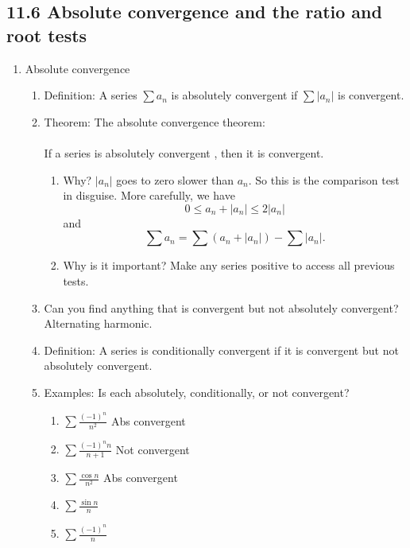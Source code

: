 \documentclass{article}
\newcommand{\ds}{\displaystyle}
\begin{document}
\subsection{11.6 Absolute convergence and the ratio and root tests}
\begin{enumerate}

\item Absolute convergence 
\begin{enumerate}

\item Definition: A series $\sum a_n$ is absolutely convergent if $\sum |a_n|$ is convergent.

\item Theorem: The absolute convergence theorem:\\ \ \\
If a series is absolutely convergent , then it is convergent. \\
\begin{enumerate}
\item Why? $|a_n|$ goes to zero slower than $a_n$. So this is the comparison test in disguise. More carefully, we have
\[
0 \leq a_n + |a_n| \leq 2|a_n|
\]
and 
\[
\sum a_n = \sum \left(a_n+|a_n|\right) - \sum |a_n|.
\]
\item Why is it important? Make any series positive to access all previous tests.
\end{enumerate}

\item Can you find anything that is convergent but not absolutely convergent? Alternating harmonic.

\item Definition: A series is conditionally convergent if it is convergent but not absolutely convergent. 

\item Examples: Is each absolutely, conditionally, or not convergent?
\begin{enumerate}
\item $\ds \sum \frac{(-1)^n}{n^2}$ Abs convergent
\item $\ds \sum \frac{(-1)^n n}{n+1}$ Not convergent
\item $\ds \sum \frac{\cos n}{n^2}$ Abs convergent
\item $\ds \sum \frac{\sin n}{n}$
\item $\ds \sum \frac{(-1)^n}{n}$
\end{enumerate}


\end{enumerate}
\end{enumerate}
\end{document}
